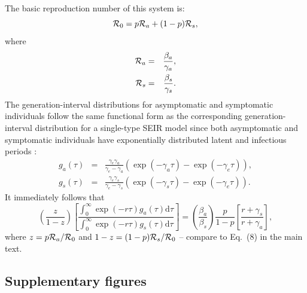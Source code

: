 \documentclass[12pt]{article}
\begin{document}
The basic reproduction number of this system is:
\begin{equation}
{\cal{R}}_{0}= p {\cal{R}}_a + (1-p) {\cal{R}}_s,
\end{equation}
where 
\begin{eqnarray}
{\cal{R}}_a &=& \frac{\beta_a}{\gamma_a},\\
{\cal{R}}_s &=& \frac{\beta_s}{\gamma_s}.
\end{eqnarray}
The generation-interval distributions for asymptomatic and symptomatic individuals follow the same functional form as the corresponding generation-interval distribution for a single-type SEIR model since both asymptomatic and symptomatic individuals have exponentially distributed latent and infectious periods \cite{svensson2015influence}:
\begin{eqnarray}
g_a(\tau) &=& \frac{\gamma_e \gamma_a}{\gamma_e - \gamma_a} \left(\exp(-\gamma_a \tau) - \exp(-\gamma_e \tau)\right),\\
g_s(\tau) &=& \frac{\gamma_e \gamma_s}{\gamma_e - \gamma_s} \left(\exp(-\gamma_s \tau) - \exp(-\gamma_e \tau)\right).
\end{eqnarray}
It immediately follows that 
\begin{equation}
\left(\frac{z}{1-z}\right)\left[\frac{\int_0^\infty \exp(-r\tau) g_a(\tau) \mathrm{d}\tau}{\int_0^\infty \exp(-r\tau) g_s(\tau) \mathrm{d}\tau}\right] = \left(\frac{\beta_a}{\beta_s}\right)\frac{p}{1-p}\left[\frac{r+\gamma_s}{r+\gamma_a}\right],
\end{equation}
where $z = p {\cal{R}}_a/{\cal{R}}_{0}$ and $1-z=(1-p) {\cal{R}}_s/{\cal{R}}_{0}$ -- compare to Eq.~(8) in the main text.

\pagebreak

\subsection*{Supplementary figures}
\end{document}
